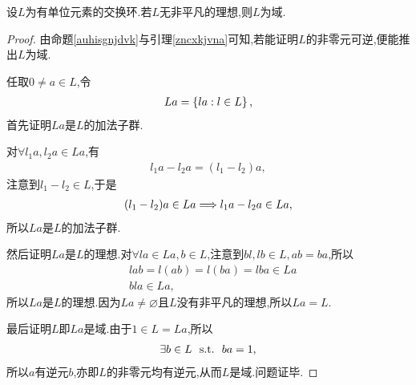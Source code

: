 \begin{problem}[P57T35]
    设$L$为有单位元素的交换环.若$L$无非平凡的理想,则$L$为域.
\end{problem}
\begin{proof}
    由命题\ref{auhisgnjdvk}与引理\ref{zncxkjvna}可知,若能证明$L$的非零元可逆,便能推出$L$为域.

    任取$0\neq a\in L$,令\begin{align*}
        La=\left\{la:l\in L\right\},
    \end{align*}首先证明$La$是$L$的加法子群.

    对$\forall l_1a,l_2a\in La$,有\begin{align*}
        l_1a-l_2a=(l_1-l_2)a,
    \end{align*}注意到$l_1-l_2\in L$,于是\begin{align*}
        (l_1-l_2)a\in La\Longrightarrow l_1a-l_2a\in La,
    \end{align*}所以$La$是$L$的加法子群.

    然后证明$La$是$L$的理想.对$\forall la\in La,b\in L$,注意到$bl,lb\in L,ab=ba$,所以\begin{align*}
        &lab=l(ab)=l(ba)=lba\in La\\
        &bla\in La,
    \end{align*}所以$La$是$L$的理想.因为$La\neq\varnothing$且$L$没有非平凡的理想,所以$La=L$.

    最后证明$L$即$La$是域.由于$1\in L=La$,所以\begin{align*}
        \exists b\in L\ \ \mathrm{s.t.}\ \  ba=1,
    \end{align*}所以$a$有逆元$b$,亦即$L$的非零元均有逆元,从而$L$是域.问题证毕.
\end{proof}